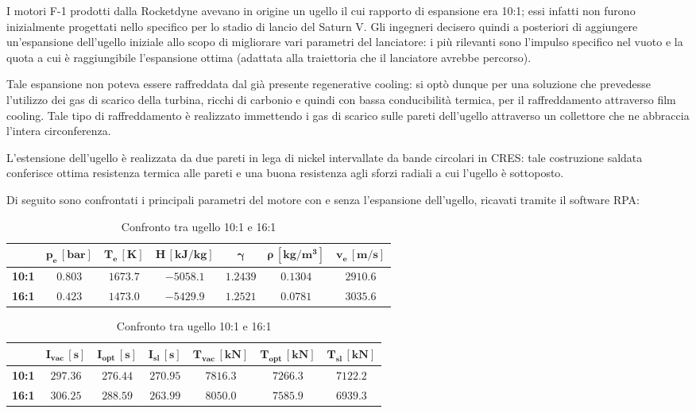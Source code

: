 I motori F-1 prodotti dalla Rocketdyne avevano in origine un ugello il cui rapporto di espansione era 10:1; essi infatti non furono inizialmente progettati nello specifico per lo stadio di lancio del Saturn V. Gli ingegneri decisero quindi a posteriori di aggiungere un'espansione dell'ugello iniziale allo scopo di migliorare vari parametri del lanciatore: i più rilevanti sono l'impulso specifico nel vuoto e la quota a cui è raggiungibile l'espansione ottima (adattata alla traiettoria che il lanciatore avrebbe percorso).

Tale espansione non poteva essere raffreddata dal già presente regenerative cooling: si optò dunque per una soluzione che prevedesse l'utilizzo dei gas di scarico della turbina, ricchi di carbonio e quindi con bassa conducibilità termica, per il raffreddamento attraverso film cooling. Tale tipo di raffreddamento è realizzato immettendo i gas di scarico sulle pareti dell'ugello attraverso un collettore che ne abbraccia l'intera circonferenza.

L'estensione dell'ugello è realizzata da due pareti in lega di nickel intervallate da bande circolari in CRES: tale costruzione saldata conferisce ottima resistenza termica alle pareti e una buona resistenza agli sforzi radiali a cui l'ugello è sottoposto.

Di seguito sono confrontati i principali parametri del motore con e senza l'espansione dell'ugello, ricavati tramite il software RPA:

\begin{table}[H]

\centering
\begin{tabular}{|c|c|c|c|c|c|c|}
\hline
& $\bm{p_e \, [bar]}$ & $\bm{T_e \, [K]}$ & $\bm{H \, [kJ/kg]}$ & $\bm{\gamma}$ & $\bm{\rho \, [kg/m^3]}$ & $\bm{v_e \, [m/s]}$ \\
\hline
\textbf{10:1} & $0.803$ & $1673.7$ & $-5058.1$ & $1.2439$ & $0.1304$ & $2910.6$ \\
\hline
\textbf{16:1} & $0.423$ & $1473.0$ & $-5429.9$ & $1.2521$ & $0.0781$ & $3035.6$ \\
\hline
\end{tabular}

\vspace{5pt}

\begin{tabular}{|c|c|c|c|c|c|c|}
\hline
& $\bm{I_{vac} \, [s]}$ & $\bm{I_{opt} \, [s]}$ & $\bm{I_{sl} \, [s]}$ & $\bm{T_{vac} \, [kN]}$ & $\bm{T_{opt} \, [kN]}$ & $\bm{T_{sl} \, [kN]}$ \\
\hline
\textbf{10:1} & $297.36$ & $276.44$ & $270.95$ & $7816.3$ & $7266.3$ & $7122.2$ \\
\hline
\textbf{16:1} & $306.25$ & $288.59$ & $263.99$ & $8050.0$ & $7585.9$ & $6939.3$ \\
\hline
\end{tabular}

\caption{Confronto tra ugello 10:1 e 16:1}
\label{table:confronto_ugello}

\end{table}

